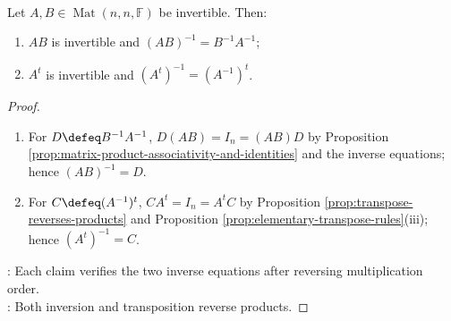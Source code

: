 \begin{corollary} \label{cor:matrix-inverse-product-and-transpose} \\
Let $A,B\in\operatorname{Mat}(n,n,\mathbb{F})$ be invertible. Then:
\begin{enumerate}[label=(\roman*)]
\setlength{\itemsep}{0pt}
\item $AB$ is invertible and $(AB)^{-1}=B^{-1}A^{-1}$;
\item $A^t$ is invertible and $(A^t)^{-1}=(A^{-1})^t$.
\end{enumerate}
\begin{proof}
\begin{enumerate}[label=(\roman*)]
\setlength{\itemsep}{0pt}
\item For $D\defeq B^{-1}A^{-1}$, $D(AB)=I_n=(AB)D$ by Proposition \ref{prop:matrix-product-associativity-and-identities} and the inverse equations; hence $(AB)^{-1}=D$.
\item For $C\defeq(A^{-1})^t$, $CA^t=I_n=A^tC$ by Proposition \ref{prop:transpose-reverses-products} and Proposition \ref{prop:elementary-transpose-rules}(iii); hence $(A^t)^{-1}=C$.
\end{enumerate}
: Each claim verifies the two inverse equations after reversing multiplication order.\\
: Both inversion and transposition reverse products.
\end{proof}
\end{corollary}
